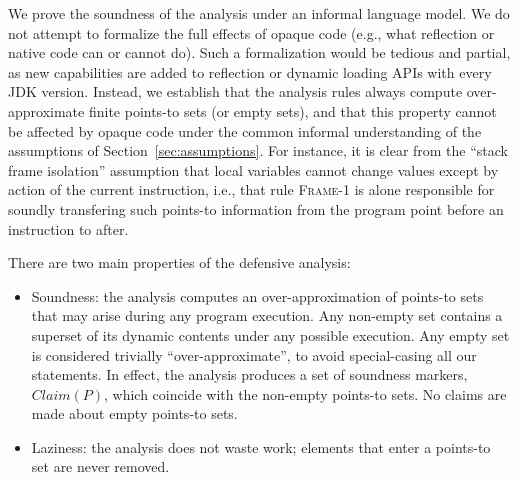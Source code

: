 We prove the soundness of the analysis under an informal language
model. We do not attempt to formalize the full effects of opaque code
(e.g., what reflection or native code can or cannot do). Such a formalization
would be tedious and partial, as new capabilities are added to reflection or
dynamic loading APIs with every JDK version. Instead, 
we establish that the analysis rules always compute over-approximate finite
points-to sets (or empty sets), and that this property cannot be
affected by opaque code under the common informal understanding of the assumptions of
Section~\ref{sec:assumptions}. For instance, it is clear from the
``stack frame isolation'' assumption that local variables cannot
change values except by action of the current instruction, i.e., that
rule \textsc{Frame-1} is alone responsible for soundly transfering
such points-to information from the program point before an
instruction to after.

There are two main properties of the defensive analysis: 

\begin{itemize}
\item Soundness: the analysis computes an over-approximation of
  points-to sets that may arise during any program execution. Any
  non-empty set contains a superset of its dynamic contents under any
  possible execution.  Any empty set is considered trivially
  ``over-approximate'', to avoid special-casing all our statements.
  In effect, the analysis produces a set of soundness markers,
  \(Claim(P)\), which coincide with the non-empty points-to
  sets. No claims are made about empty points-to sets.


\item Laziness: the analysis does not waste work; elements that enter a
  points-to set are never removed.
\end{itemize}

